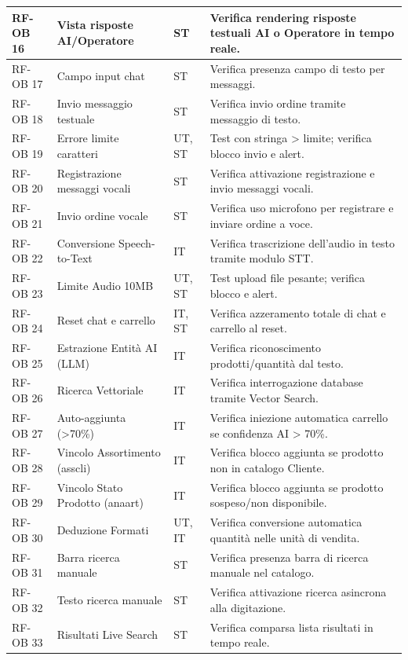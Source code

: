 \documentclass[a4paper,11pt,oneside]{scrartcl}
\begin{document}
\begin{longtable}{|p{1.5cm}|p{4.5cm}|p{1.8cm}|p{6cm}|}
RF-OB 16 & Vista risposte AI/Operatore & ST & Verifica rendering risposte testuali AI o Operatore in tempo reale. \\ \hline
RF-OB 17 & Campo input chat & ST & Verifica presenza campo di testo per messaggi. \\ \hline
RF-OB 18 & Invio messaggio testuale & ST & Verifica invio ordine tramite messaggio di testo. \\ \hline
RF-OB 19 & Errore limite caratteri & UT, ST & Test con stringa > limite; verifica blocco invio e alert. \\ \hline
RF-OB 20 & Registrazione messaggi vocali & ST & Verifica attivazione registrazione e invio messaggi vocali. \\ \hline
RF-OB 21 & Invio ordine vocale & ST & Verifica uso microfono per registrare e inviare ordine a voce. \\ \hline
RF-OB 22 & Conversione Speech-to-Text & IT & Verifica trascrizione dell'audio in testo tramite modulo STT. \\ \hline
RF-OB 23 & Limite Audio 10MB & UT, ST & Test upload file pesante; verifica blocco e alert. \\ \hline
RF-OB 24 & Reset chat e carrello & IT, ST & Verifica azzeramento totale di chat e carrello al reset. \\ \hline
RF-OB 25 & Estrazione Entità AI (LLM) & IT & Verifica riconoscimento prodotti/quantità dal testo. \\ \hline
RF-OB 26 & Ricerca Vettoriale & IT & Verifica interrogazione database tramite Vector Search. \\ \hline
RF-OB 27 & Auto-aggiunta (>70\%) & IT & Verifica iniezione automatica carrello se confidenza AI > 70\%. \\ \hline
RF-OB 28 & Vincolo Assortimento (asscli) & IT & Verifica blocco aggiunta se prodotto non in catalogo Cliente. \\ \hline
RF-OB 29 & Vincolo Stato Prodotto (anaart) & IT & Verifica blocco aggiunta se prodotto sospeso/non disponibile. \\ \hline
RF-OB 30 & Deduzione Formati & UT, IT & Verifica conversione automatica quantità nelle unità di vendita. \\ \hline
RF-OB 31 & Barra ricerca manuale & ST & Verifica presenza barra di ricerca manuale nel catalogo. \\ \hline
RF-OB 32 & Testo ricerca manuale & ST & Verifica attivazione ricerca asincrona alla digitazione. \\ \hline
RF-OB 33 & Risultati Live Search & ST & Verifica comparsa lista risultati in tempo reale. \\ \hline

\end{longtable}
\end{document}
